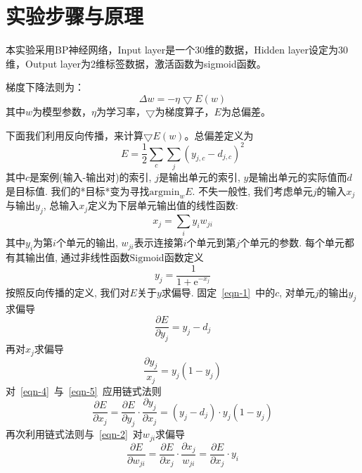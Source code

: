 \documentclass[a4paper,12pt]{report}
\begin{document}
\section{实验步骤与原理}
\par 本实验采用BP神经网络，Input layer是一个30维的数据，Hidden layer设定为30维，Output layer为2维标签数据，激活函数为sigmoid函数。
\par 梯度下降法则为：
$$
\Delta w=-\eta \bigtriangledown E(w)
$$
其中$w$为模型参数，$\eta$为学习率，$\bigtriangledown$为梯度算子，$E$为总偏差。
\par 下面我们利用反向传播，来计算$\bigtriangledown E(w)$。总偏差定义为
\begin{equation}\label{eqn-1} 
  E=\frac{1}{2}\sum_{c}\sum_{j}(y_{j,c}-d_{j,c})^{2}
\end{equation}
其中$c$是案例(输入-输出对)的索引, $j$是输出单元的索引, $y$是输出单元的实际值而$d$是目标值. 我们的*目标*变为寻找$\mathrm{argmin}_{w}E$.
不失一般性, 我们考虑单元$j$的输入$x_{j}$与输出$y_{j}$, 总输入$x_{j}$定义为下层单元输出值的线性函数:
\begin{equation}\label{eqn-2} 
  x_{j}=\sum_{i}y_{i}w_{ji}
\end{equation}
其中$y_{i}$为第$i$个单元的输出, $w_{ji}$表示连接第$i$个单元到第$j$个单元的参数.
每个单元都有其输出值, 通过非线性函数$\mathrm{Sigmoid}$函数定义
\begin{equation}\label{eqn-3} 
  y_{j}=\frac{1}{1+\mathrm{e}^{-x_{j}}}
\end{equation}
按照反向传播的定义, 我们对$E$关于$y$求偏导. 固定~\ref{eqn-1}\ 中的$c$, 对单元$j$的输出$y_{j}$求偏导
\begin{equation}\label{eqn-4} 
  \frac{\partial E}{\partial y_{j}}=y_{j}-d_{j}
\end{equation}
再对$x_{j}$求偏导
\begin{equation}\label{eqn-5} 
  \frac{\partial y_{j}}{x_{j}}=y_{j}(1-y_{j})
\end{equation}
对~\ref{eqn-4}\ 与~\ref{eqn-5}\ 应用链式法则
\begin{equation}\label{eqn-6} 
  \frac{\partial E}{\partial x_{j}}=\frac{\partial E}{\partial y_{j}}\cdot\frac{\partial y_{j}}{\partial x_{j}}=(y_{j}-d_{j})\cdot y_{j}(1-y_{j})
\end{equation}
再次利用链式法则与~\ref{eqn-2}\ 对$w_{ji}$求偏导
\begin{equation}\label{eqn-7} 
  \frac{\partial E}{\partial w_{ji}}=\frac{\partial E}{\partial x_{j}}\cdot\frac{\partial x_{j}}{w_{ji}}=\frac{\partial E}{\partial x_{j}}\cdot y_{i}
\end{equation}
\end{document}
